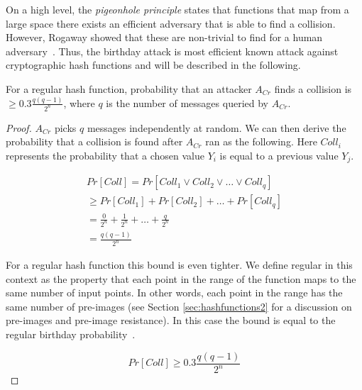 \begin{figure}
\end{figure}


On a high level, the \emph{pigeonhole principle} states that functions that map from a large space there exists an efficient adversary that is able to find a collision.
However, Rogaway showed that these are non-trivial to find for a human adversary~\cite{rogaway2006formalizing}.
Thus, the birthday attack is most efficient known attack against cryptographic hash functions and will be described in the following.

\begin{theorem*}
For a regular hash function, probability that an attacker $A_{Cr}$ finds a collision is $\ge 0.3 \frac{q(q-1)}{2^n}$, where $q$ is the number of messages queried by $A_{Cr}$.
\end{theorem*}

\begin{proof}
    $A_{Cr}$ picks $q$ messages independently at random. We can then derive the probability that a collision is found after $A_{Cr}$ ran as the following. Here ${Coll}_i$ represents the probability that a chosen value $Y_i$ is equal to a previous value $Y_j$.

\begin{align*}
    Pr[Coll] = Pr[{Coll}_1 \lor {Coll}_2 \lor \dots \lor {Coll}_q] \\
             \geq Pr[{Coll}_1] + Pr[{Coll}_2] + \dots + Pr[{Coll}_q] \\
             = \frac{0}{2^n} + \frac{1}{2^n} + \dots + \frac{q}{2^n} \\
             = \frac{q(q-1)}{2^n}
\end{align*}

For a regular hash function this bound is even tighter.
We define regular in this context as the property that each point in the range of the function maps to the same number of input points.
In other words, each point in the range has the same number of pre-images (see Section \ref{sec:hashfunctions2} for a discussion on pre-images and pre-image resistance).
In this case the bound is equal to the regular birthday probability~.

$$
    Pr[Coll] \geq 0.3 \frac{q(q-1)}{2^n}
$$
\end{proof}

